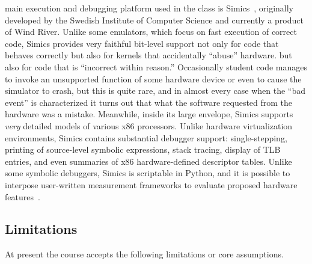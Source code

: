  main execution and debugging
platform used in the class is
Simics~\cite{simics},
originally developed by the Swedish Institute of
Computer Science and
currently a product of Wind River.
Unlike some emulators,
which focus on fast execution of correct code,
Simics
provides very faithful bit-level support
not only for code that behaves correctly
\shortversion
{but also for kernels that accidentally ``abuse'' hardware.}
{but also for code that is ``incorrect within reason.''
Occasionally student code manages to invoke an unsupported
function of some hardware device or even to cause the
simulator to crash, but this is quite rare, and in almost
every case when the ``bad event'' is characterized it turns
out that what the software requested from the hardware was
a mistake.
Meanwhile, inside its large envelope, Simics supports
\textit{very} detailed models of various x86 processors.}
Unlike hardware virtualization environments,
Simics contains substantial debugger support:
single-stepping,
printing of source-level symbolic
expressions,
stack tracing,
display of TLB entries,
and even summaries of x86 hardware-defined descriptor tables.
Unlike some symbolic debuggers,
Simics is scriptable in Python,
and it is possible to interpose user-written measurement
frameworks to evaluate proposed hardware
features~.


\subsection{Limitations}

At present the course accepts the following limitations
or core assumptions.

